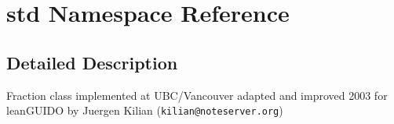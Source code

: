 \section{std Namespace Reference}
\label{namespacestd}




\subsection{Detailed Description}
Fraction class implemented at UBC/Vancouver adapted and improved 2003 for lean\-GUIDO by Juergen Kilian ({\tt kilian@noteserver.org}) 

